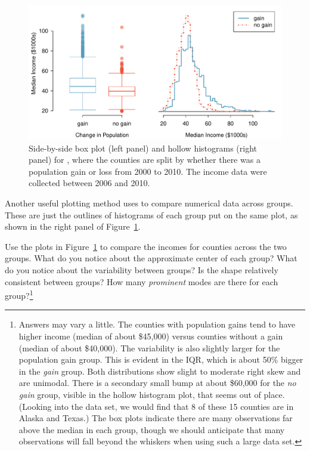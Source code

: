 \begin{figure}
   \centering
   \includegraphics[width=\textwidth]{ch_intro_to_data/figures/countyIncomeSplitByPopGain/countyIncomeSplitByPopGain}
   \caption{Side-by-side box plot (left panel) and hollow histograms (right panel) for , where the counties are split by whether there was a population gain or loss from 2000 to 2010. The income data were collected between 2006 and 2010.}
   \label{countyIncomeSplitByPopGain}
\end{figure}

Another useful plotting method uses  to compare numerical data across groups. These are just the outlines of histograms of each group put on the same plot, as shown in the right panel of Figure~\ref{countyIncomeSplitByPopGain}.

\begin{exercise} \label{comparingPriceByTypeExercise}
Use the plots in Figure~\ref{countyIncomeSplitByPopGain} to compare the incomes for counties across the two groups. What do you notice about the approximate center of each group? What do you notice about the variability between groups? Is the shape relatively consistent between groups? How many \emph{prominent} modes are there for each group?\footnote{Answers may vary a little. The counties with population gains tend to have higher income (median of about \$45,000) versus counties without a gain (median of about \$40,000). The variability is also slightly larger for the population gain group. This is evident in the IQR, which is about 50\% bigger in the \emph{gain} group. Both distributions show slight to moderate right skew and are unimodal. There is a secondary small bump at about \$60,000 for the \emph{no gain} group, visible in the hollow histogram plot, that seems out of place. (Looking into the data set, we would find that 8 of these 15 counties are in Alaska and Texas.) The box plots indicate there are many observations far above the median in each group, though we should anticipate that many observations will fall beyond the whiskers when using such a large data set.}
\end{exercise}

